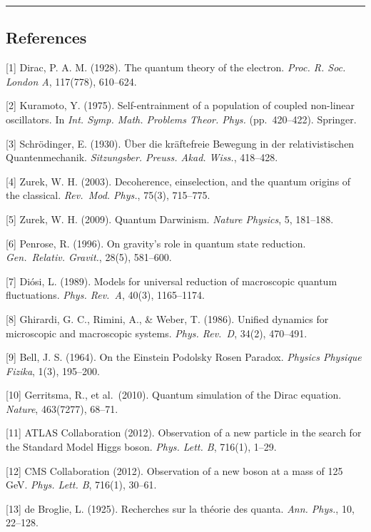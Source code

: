 \documentclass[
]{article}
\begin{document}
\begin{center}\rule{0.5\linewidth}{0.5pt}\end{center}

\subsection{References}\label{references}

{[}1{]} Dirac, P. A. M. (1928). The quantum theory of the electron.
\emph{Proc. R. Soc. London A}, 117(778), 610--624.

{[}2{]} Kuramoto, Y. (1975). Self-entrainment of a population of coupled
non-linear oscillators. In \emph{Int. Symp. Math. Problems Theor. Phys.}
(pp.~420--422). Springer.

{[}3{]} Schrödinger, E. (1930). Über die kräftefreie Bewegung in der
relativistischen Quantenmechanik. \emph{Sitzungsber. Preuss. Akad.
Wiss.}, 418--428.

{[}4{]} Zurek, W. H. (2003). Decoherence, einselection, and the quantum
origins of the classical. \emph{Rev.~Mod. Phys.}, 75(3), 715--775.

{[}5{]} Zurek, W. H. (2009). Quantum Darwinism. \emph{Nature Physics},
5, 181--188.

{[}6{]} Penrose, R. (1996). On gravity's role in quantum state
reduction. \emph{Gen.~Relativ. Gravit.}, 28(5), 581--600.

{[}7{]} Diósi, L. (1989). Models for universal reduction of macroscopic
quantum fluctuations. \emph{Phys. Rev.~A}, 40(3), 1165--1174.

{[}8{]} Ghirardi, G. C., Rimini, A., \& Weber, T. (1986). Unified
dynamics for microscopic and macroscopic systems. \emph{Phys. Rev.~D},
34(2), 470--491.

{[}9{]} Bell, J. S. (1964). On the Einstein Podolsky Rosen Paradox.
\emph{Physics Physique Fizika}, 1(3), 195--200.

{[}10{]} Gerritsma, R., et al.~(2010). Quantum simulation of the Dirac
equation. \emph{Nature}, 463(7277), 68--71.

{[}11{]} ATLAS Collaboration (2012). Observation of a new particle in
the search for the Standard Model Higgs boson. \emph{Phys. Lett. B},
716(1), 1--29.

{[}12{]} CMS Collaboration (2012). Observation of a new boson at a mass
of 125 GeV. \emph{Phys. Lett. B}, 716(1), 30--61.

{[}13{]} de Broglie, L. (1925). Recherches sur la théorie des quanta.
\emph{Ann. Phys.}, 10, 22--128.
\end{document}
